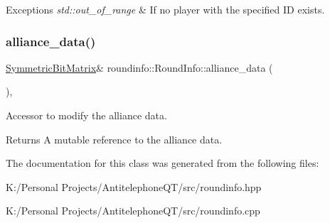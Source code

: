 \begin{DoxyExceptions}{Exceptions}
{\em std\+::out\+\_\+of\+\_\+range} & If no player with the specified ID exists. \\
\hline
\end{DoxyExceptions}
\mbox{\label{classroundinfo_1_1_round_info_a9d5ae58298d3acd11377da7992235762}} 
\subsubsection{\texorpdfstring{alliance\+\_\+data()}{alliance\_data()}\hspace{0.1cm}{\footnotesize\ttfamily [2/2]}}
{\footnotesize\ttfamily \hyperlink{class_symmetric_bit_matrix}{Symmetric\+Bit\+Matrix}\& roundinfo\+::\+Round\+Info\+::alliance\+\_\+data (\begin{DoxyParamCaption}{ }\end{DoxyParamCaption})\hspace{0.3cm}{\ttfamily [inline]}, {\ttfamily [noexcept]}}



Accessor to modify the alliance data. 

\begin{DoxyReturn}{Returns}
A mutable reference to the alliance data. 
\end{DoxyReturn}


The documentation for this class was generated from the following files\+:\begin{DoxyCompactItemize}
\item 
K\+:/\+Personal Projects/\+Antitelephone\+Q\+T/src/roundinfo.\+hpp\item 
K\+:/\+Personal Projects/\+Antitelephone\+Q\+T/src/roundinfo.\+cpp\end{DoxyCompactItemize}

